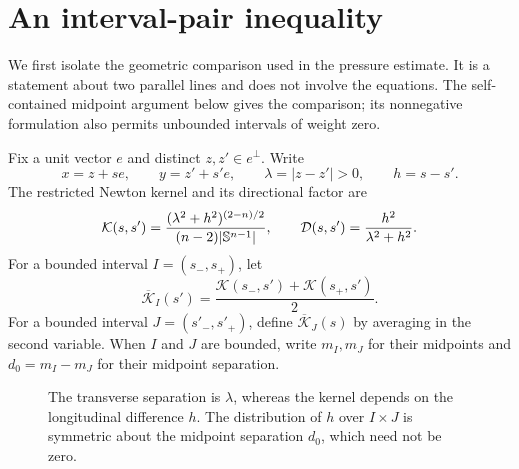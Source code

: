 \section{An interval-pair inequality}\label{sec:intervals}

We first isolate the geometric comparison used in the pressure estimate.
It is a statement about two parallel lines and does not involve the
equations. The self-contained midpoint argument below gives the
comparison; its nonnegative formulation also permits unbounded
intervals of weight zero.

Fix a unit vector $e$ and distinct $z,z'\in e^\perp$.  Write
\[
 x=z+se,\qquad y=z'+s'e,\qquad
 \lambda=|z-z'|>0,\qquad h=s-s'.
\]
The restricted Newton kernel and its directional factor are
\[
 \mathcal K(s,s')
 =\frac{(\lambda^2+h^2)^{(2-n)/2}}{(n-2)|\mathbb S^{n-1}|},
 \qquad \mathcal D(s,s')=\frac{h^2}{\lambda^2+h^2}.
\]
For a bounded interval $I=(s_-,s_+)$, let
\[
 \overline{\mathcal K}_I(s')
 =\frac{\mathcal K(s_-,s')+\mathcal K(s_+,s')}{2}.
\]
For a bounded interval $J=(s'_-,s'_+)$, define
$\overline{\mathcal K}_J(s)$ by averaging in the second variable.
When $I$ and $J$ are bounded, write $m_I,m_J$ for their midpoints and
$d_0=m_I-m_J$ for their midpoint separation.

\begin{figure}[htbp]
\centering
{}
\caption{The transverse separation is $\lambda$, whereas the kernel
depends on the longitudinal difference $h$.  The distribution of $h$
over $I\times J$ is symmetric about the midpoint separation $d_0$,
which need not be zero.}
\label{fig:interval-geometry}
\end{figure}

